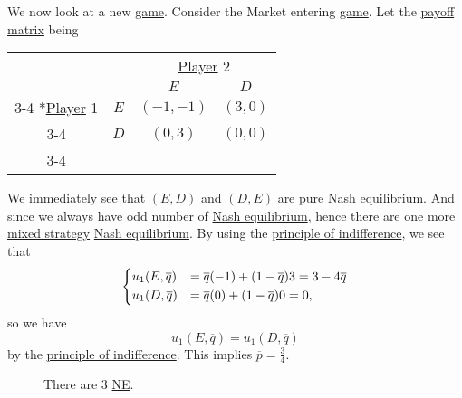 \begin{eg}\label{eg:market-entering}
	We now look at a new \hyperref[def:game]{game}. Consider the Market entering \hyperref[def:game]{game}. Let the \hyperref[def:payoff-matrix]{payoff matrix} being
	\begin{table}[H]
		\centering
		\setlength{\extrarowheight}{2pt}
		\begin{tabular}{cc|c|c|}
			                                               & \multicolumn{1}{c}{} & \multicolumn{2}{c}{\hyperref[def:player]{Player} 2}                           \\
			                                               & \multicolumn{1}{c}{} & \multicolumn{1}{c}{$E$}                             & \multicolumn{1}{c}{$D$} \\\cline{3-4}
			\multirow{2}*{\hyperref[def:player]{Player} 1} & $E$                  & $(-1, -1)$                                          & $(3, 0)$                \\\cline{3-4}
			                                               & $D$                  & $(0, 3)$                                            & $(0, 0)$                \\\cline{3-4}
		\end{tabular}
	\end{table}
	We immediately see that \((E, D)\) and \((D, E)\) are \hyperref[def:pure-strategy]{pure} \hyperref[def:Nash-equilibrium]{Nash equilibrium}. And since we always
	have odd number of \hyperref[def:Nash-equilibrium]{Nash equilibrium}, hence there are one more \hyperref[def:mixed-strategy]{mixed strategy}
	\hyperref[def:Nash-equilibrium]{Nash equilibrium}. By using the \hyperref[thm:principle-of-indifference]{principle of indifference}, we see that
	\[
		\begin{dcases}
			u_1(E, \overline{q}) & = \overline{q}( - 1)+(1-\overline{q})3 = 3 - 4 \overline{q} \\
			u_1(D, \overline{q}) & = \overline{q}(0)+(1 - \overline{q})0 = 0,
		\end{dcases}
	\]
	so we have
	\[
		u_1(E, \overline{q}) = u_1(D, \overline{q})
	\]
	by the \hyperref[thm:principle-of-indifference]{principle of indifference}. This implies \(\overline{p} = \frac{3}{4}\).
	\begin{figure}[H]
		\centering
		\caption{There are \(3\) \hyperref[def:Nash-equilibrium]{NE}.}
		\label{fig:NE-market-entering}
	\end{figure}
\end{eg}